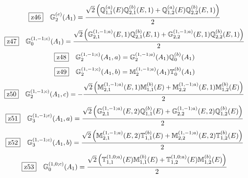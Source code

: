 \documentclass[fleqn,10pt,landscape]{jsarticle}
\begin{document}
\begin{dmath*}
\hspace*{3mm}\fbox{z46}\quad \mathbb{G}_{2}^{(c)}(A_{1})=\frac{\sqrt{2} \left(\mathbb{Q}_{1,1}^{(a)}(E) \mathbb{Q}_{2,1}^{(b)}(E,1) + \mathbb{Q}_{1,2}^{(a)}(E) \mathbb{Q}_{2,2}^{(b)}(E,1)\right)}{2}
\end{dmath*}
\begin{dmath*}
\hspace*{3mm}\fbox{z47}\quad \mathbb{G}_{0}^{(1,-1;c)}(A_{1})=\frac{\sqrt{2} \left(\mathbb{G}_{2,1}^{(1,-1;a)}(E,1) \mathbb{Q}_{2,1}^{(b)}(E,1) + \mathbb{G}_{2,2}^{(1,-1;a)}(E,1) \mathbb{Q}_{2,2}^{(b)}(E,1)\right)}{2}
\end{dmath*}
\begin{dmath*}
\hspace*{3mm}\fbox{z48}\quad \mathbb{G}_{2}^{(1,-1;c)}(A_{1},a)=\mathbb{G}_{2}^{(1,-1;a)}(A_{1}) \mathbb{Q}_{0}^{(b)}(A_{1})
\end{dmath*}
\begin{dmath*}
\hspace*{3mm}\fbox{z49}\quad \mathbb{G}_{2}^{(1,-1;c)}(A_{1},b)=\mathbb{M}_{2}^{(1,-1;a)}(A_{1}) \mathbb{T}_{0}^{(b)}(A_{1})
\end{dmath*}
\begin{dmath*}
\hspace*{3mm}\fbox{z50}\quad \mathbb{G}_{2}^{(1,-1;c)}(A_{1},c)=- \frac{\sqrt{2} \left(\mathbb{M}_{2,1}^{(1,-1;a)}(E,1) \mathbb{M}_{1,1}^{(b)}(E) + \mathbb{M}_{2,2}^{(1,-1;a)}(E,1) \mathbb{M}_{1,2}^{(b)}(E)\right)}{2}
\end{dmath*}
\begin{dmath*}
\hspace*{3mm}\fbox{z51}\quad \mathbb{G}_{3}^{(1,-1;c)}(A_{1},a)=\frac{\sqrt{2} \left(\mathbb{G}_{2,1}^{(1,-1;a)}(E,2) \mathbb{Q}_{1,1}^{(b)}(E) + \mathbb{G}_{2,2}^{(1,-1;a)}(E,2) \mathbb{Q}_{1,2}^{(b)}(E)\right)}{2}
\end{dmath*}
\begin{dmath*}
\hspace*{3mm}\fbox{z52}\quad \mathbb{G}_{3}^{(1,-1;c)}(A_{1},b)=\frac{\sqrt{2} \left(\mathbb{M}_{2,1}^{(1,-1;a)}(E,2) \mathbb{T}_{1,1}^{(b)}(E) + \mathbb{M}_{2,2}^{(1,-1;a)}(E,2) \mathbb{T}_{1,2}^{(b)}(E)\right)}{2}
\end{dmath*}
\begin{dmath*}
\hspace*{3mm}\fbox{z53}\quad \mathbb{G}_{0}^{(1,0;c)}(A_{1})=\frac{\sqrt{2} \left(\mathbb{T}_{1,1}^{(1,0;a)}(E) \mathbb{M}_{1,1}^{(b)}(E) + \mathbb{T}_{1,2}^{(1,0;a)}(E) \mathbb{M}_{1,2}^{(b)}(E)\right)}{2}
\end{dmath*}
\end{document}
